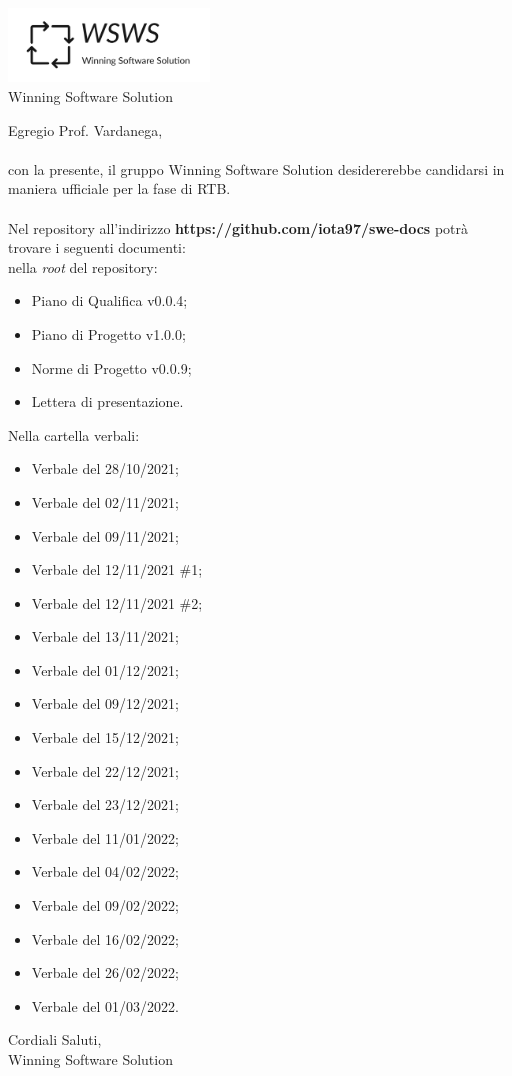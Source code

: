 \documentclass[a4paper, 12pt]{letter}
\begin{document}
\begin{center}
\includegraphics[width=0.4\textwidth]{WSWS-logos_transparent_crop}\\
{\Large Winning Software Solution}\\[24pt]
\end{center}
Egregio Prof. Vardanega,\\\\
con la presente, il gruppo Winning Software Solution desidererebbe candidarsi in maniera ufficiale
per la fase di RTB.\\\\
Nel repository all'indirizzo \textbf{https://github.com/iota97/swe-docs} potrà trovare i seguenti documenti:\\
nella \textit{root} del repository:
\begin{itemize}
\item Piano di Qualifica v0.0.4;
\item Piano di Progetto v1.0.0;
\item Norme di Progetto v0.0.9;
\item Lettera di presentazione.
\end{itemize}
Nella cartella verbali:
\begin{itemize}
\item Verbale del 28/10/2021;
\item Verbale del 02/11/2021;
\item Verbale del 09/11/2021;
\item Verbale del 12/11/2021 \#1;
\item Verbale del 12/11/2021 \#2;
\item Verbale del 13/11/2021;
\item Verbale del 01/12/2021;
\item Verbale del 09/12/2021;
\item Verbale del 15/12/2021;
\item Verbale del 22/12/2021;
\item Verbale del 23/12/2021;
\item Verbale del 11/01/2022;
\item Verbale del 04/02/2022;
\item Verbale del 09/02/2022;
\item Verbale del 16/02/2022;
\item Verbale del 26/02/2022;
\item Verbale del 01/03/2022.
\end{itemize}
\begin{flushright}
Cordiali Saluti,\\
Winning Software Solution
\end{flushright}
\end{document}
